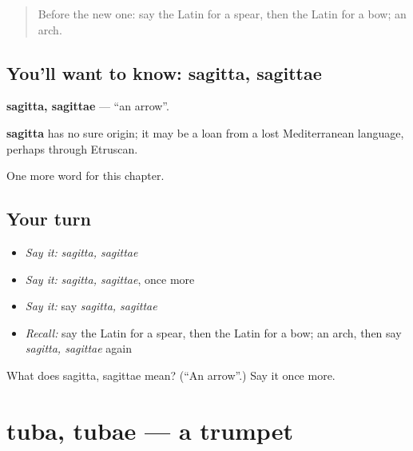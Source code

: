 \label{lesson:LA-C277-sagitta}



\begin{quote}
Before the new one: say the Latin for a spear, then the Latin for a bow; an arch.
\end{quote}

\subsection*{You'll want to know: sagitta, sagittae}
\textbf{sagitta, sagittae} — \textquotedblleft{}an arrow\textquotedblright{}.

\begin{cousinweb}
\textbf{sagitta} has no sure origin; it may be a loan from a lost Mediterranean language, perhaps through Etruscan.
\end{cousinweb}

\begin{grammarlens}[title={What you've built}]
One more word for this chapter.
\end{grammarlens}

\subsection*{Your turn}
\begin{itemize}
\raggedright
  \item \emph{Say it:} \emph{sagitta, sagittae}
  \item \emph{Say it:} \emph{sagitta, sagittae}, once more
  \item \emph{Say it:} say \emph{sagitta, sagittae}
  \item \emph{Recall:} say the Latin for a spear, then the Latin for a bow; an arch, then say \emph{sagitta, sagittae} again
\end{itemize}

\begin{tcolorbox}[breakable,colback=teal!4,colframe=teal!35!black,title={Before you move on}]
What does sagitta, sagittae mean? (\textquotedblleft{}An arrow\textquotedblright{}.) Say it once more.
\end{tcolorbox}
\section[tuba, tubae]{tuba, tubae — a trumpet}

\label{lesson:LA-C277-tuba}



